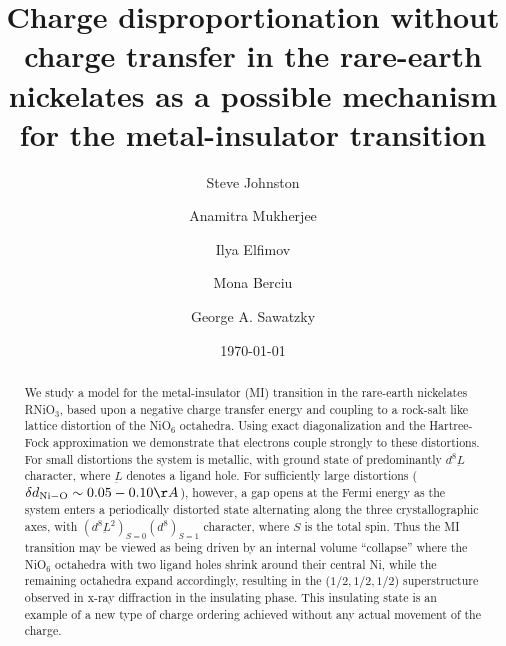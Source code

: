 \documentclass[showpacs,preprintnumbers,amsmath,amssymb,prl,aps,twocolumn,superscriptaddress]{revtex4}
\newcommand{\ligand}{{\underbar L}}
\begin{document}


\title{Charge disproportionation without charge transfer in the rare-earth 
nickelates as a possible mechanism for the metal-insulator transition}

\author{Steve Johnston}

\author{Anamitra Mukherjee}

\author{Ilya Elfimov}

\author{Mona Berciu}

\author{George A. Sawatzky}


\date{\today}

\begin{abstract}
We study a model for the metal-insulator (MI) transition in the
rare-earth nickelates RNiO$_3$, based upon a negative charge transfer
energy and coupling to a rock-salt like lattice distortion of the
NiO$_6$ octahedra. Using exact diagonalization and the Hartree-Fock
approximation we demonstrate that electrons couple strongly to these
distortions. For small distortions the system is metallic, with ground
state of predominantly $d^8\ligand$ character, 
where $\ligand$ denotes a ligand hole. For
sufficiently large distortions ($\delta d_{\rm Ni-O} \sim 0.05 -
0.10\AA$), however, a gap opens at the Fermi energy as the system
enters a 
periodically distorted state  alternating along the three
crystallographic axes, with $(d^8\ligand^2)_{S=0}(d^8)_{S=1}$
character, where  
$S$ is the total spin. Thus
the MI transition may be viewed as being driven by an  internal volume
``collapse'' where the NiO$_6$ octahedra with two ligand holes
shrink around their central Ni, while the remaining octahedra expand
accordingly, resulting in the ($1/2,1/2,1/2$) superstructure observed
in x-ray diffraction in the insulating phase. This insulating state is
an example of a new type of charge ordering achieved without any actual
movement of the charge. 
\end{abstract}
\end{document}
